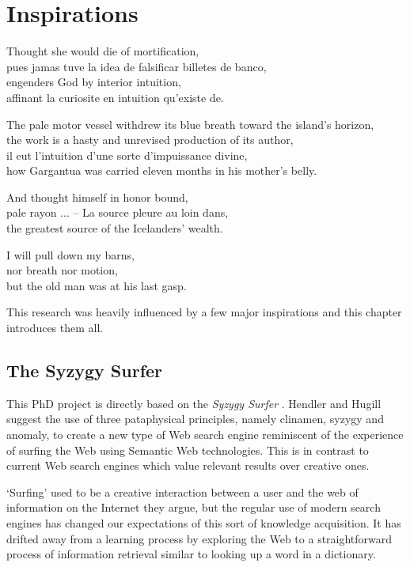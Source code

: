 
\chapter{Inspirations}
\label{ch:inspirations}

\startcontents[chapters]

\vfill

Thought she would die of mortification, \\
pues jamas tuve la idea de falsificar billetes de banco, \\
engenders God by interior intuition, \\
affinant la curiosite en intuition qu'existe de.

The pale motor vessel withdrew its blue breath toward the island's horizon, \\
the work is a hasty and unrevised production of its author, \\
il eut l'intuition d'une sorte d'impuissance divine, \\
how Gargantua was carried eleven months in his mother's belly.

And thought himself in honor bound, \\
pale rayon ... -- La source pleure au loin dans, \\
the greatest source of the Icelanders' wealth.

I will pull down my barns, \\
nor breath nor motion, \\
but the old man was at his last gasp.

\newpage
\minicontents
\spirals

This research was heavily influenced by a few major inspirations and this chapter introduces them all.


\section{The Syzygy Surfer}

This PhD project is directly based on the \textit{Syzygy Surfer} \autocite{Hendler2011, Hendler2013}. Hendler and Hugill suggest the use of three pataphysical principles, namely clinamen, syzygy and anomaly, to create a new type of Web search engine reminiscent of the experience of surfing the Web using Semantic Web technologies. This is in contrast to current Web search engines which value relevant results over creative ones.

`Surfing' used to be a creative interaction between a user and the web of information on the Internet they argue, but the regular use of modern search engines has changed our expectations of this sort of knowledge acquisition. It has drifted away from a learning process by exploring the Web to a straightforward process of information retrieval similar to looking up a word in a dictionary.

